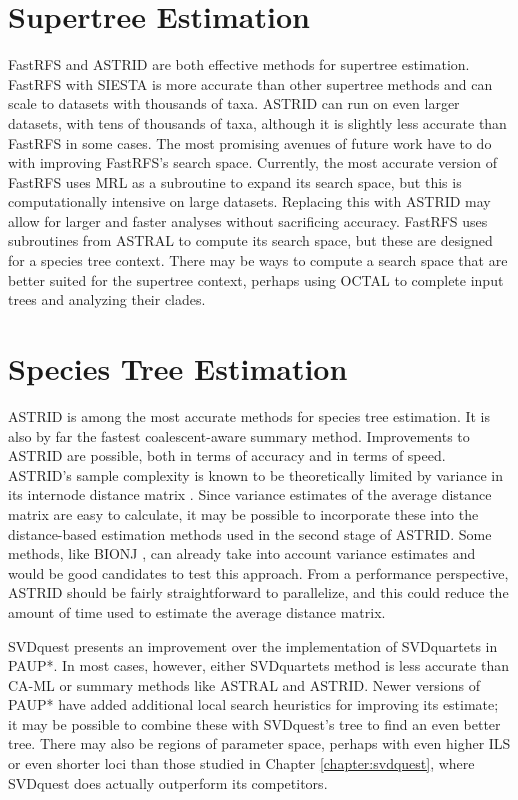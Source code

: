 \section{Supertree Estimation}

FastRFS and ASTRID are both effective methods for supertree estimation. FastRFS with SIESTA is more accurate than other supertree methods and can scale to datasets with thousands of taxa. ASTRID can run on even larger datasets, with tens of thousands of taxa, although it is slightly less accurate than FastRFS in some cases. The most promising avenues of future work have to do with improving FastRFS's search space. Currently, the most accurate version of FastRFS uses MRL as a subroutine to expand its search space, but this is computationally intensive on large datasets. Replacing this with ASTRID may allow for larger and faster analyses without sacrificing accuracy. FastRFS uses subroutines from ASTRAL to compute its search space, but these are designed for a species tree context. There may be ways to compute a search space that are better suited for the supertree context, perhaps using OCTAL \cite{christensen2018octal} to complete input trees and analyzing their clades.

\section{Species Tree Estimation}

ASTRID is among the most accurate methods for species tree estimation. It is also by far the fastest coalescent-aware summary method. Improvements to ASTRID are possible, both in terms of accuracy and in terms of speed. ASTRID's sample complexity is known to be theoretically limited by variance in its internode distance matrix \cite{roch2018variance}. Since variance estimates of the average distance matrix are easy to calculate, it may be possible to incorporate these into the distance-based estimation methods used in the second stage of ASTRID. Some methods, like BIONJ \cite{gascuel1997bionj}, can already take into account variance estimates and would be good candidates to test this approach. From a performance perspective, ASTRID should be fairly straightforward to parallelize, and this could reduce the amount of time used to estimate the average distance matrix. 

SVDquest presents an improvement over the implementation of SVDquartets in PAUP*. In most cases, however, either SVDquartets method is less accurate than CA-ML or summary methods like ASTRAL and ASTRID. Newer versions of PAUP* have added additional local search heuristics for improving its estimate; it may be possible to combine these with SVDquest's tree to find an even better tree. There may also be regions of parameter space, perhaps with even higher ILS or even shorter loci than those studied in Chapter \ref{chapter:svdquest}, where SVDquest does actually outperform its competitors. 

